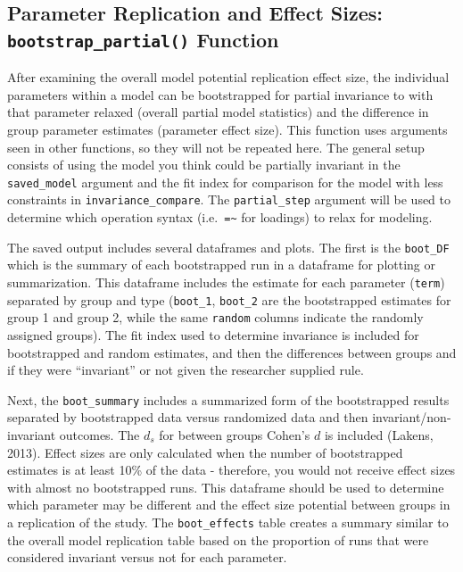 \documentclass[
  man]{apa7}
\begin{document}
\subsection{\texorpdfstring{Parameter Replication and Effect Sizes: \texttt{bootstrap\_partial()} Function}{Parameter Replication and Effect Sizes: bootstrap\_partial() Function}}\label{parameter-replication-and-effect-sizes-bootstrap_partial-function}

After examining the overall model potential replication effect size, the individual parameters within a model can be bootstrapped for partial invariance to with that parameter relaxed (overall partial model statistics) and the difference in group parameter estimates (parameter effect size). This function uses arguments seen in other functions, so they will not be repeated here. The general setup consists of using the model you think could be partially invariant in the \texttt{saved\_model} argument and the fit index for comparison for the model with less constraints in \texttt{invariance\_compare}. The \texttt{partial\_step} argument will be used to determine which operation syntax (i.e.~\texttt{=\textasciitilde{}} for loadings) to relax for modeling.

The saved output includes several dataframes and plots. The first is the \texttt{boot\_DF} which is the summary of each bootstrapped run in a dataframe for plotting or summarization. This dataframe includes the estimate for each parameter (\texttt{term}) separated by group and type (\texttt{boot\_1}, \texttt{boot\_2} are the bootstrapped estimates for group 1 and group 2, while the same \texttt{random} columns indicate the randomly assigned groups). The fit index used to determine invariance is included for bootstrapped and random estimates, and then the differences between groups and if they were ``invariant'' or not given the researcher supplied rule.

Next, the \texttt{boot\_summary} includes a summarized form of the bootstrapped results separated by bootstrapped data versus randomized data and then invariant/non-invariant outcomes. The \(d_s\) for between groups Cohen's \(d\) is included (Lakens, 2013). Effect sizes are only calculated when the number of bootstrapped estimates is at least 10\% of the data - therefore, you would not receive effect sizes with almost no bootstrapped runs. This dataframe should be used to determine which parameter may be different and the effect size potential between groups in a replication of the study. The \texttt{boot\_effects} table creates a summary similar to the overall model replication table based on the proportion of runs that were considered invariant versus not for each parameter.
\end{document}
